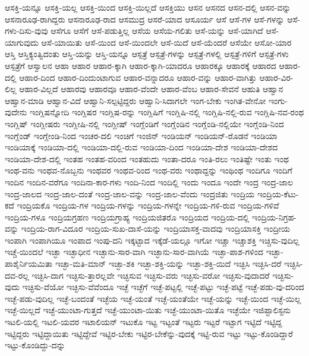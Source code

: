 {ಆಸಕ್ತಿ-ಯನ್ನೂ
ಆಸಕ್ತಿ-ಯಲ್ಲ
ಆಸಕ್ತಿ-ಯಿಂದ
ಆಸಕ್ತಿ-ಯಿಲ್ಲದೆ
ಆಸಕ್ತಿಯು
ಆಸನ
ಆಸನದ
ಆಸನ-ದಲ್ಲಿ
ಆಸನ-ವನ್ನು
ಆಸನಾರೂಢ-ರಾಗಿದ್ದರು
ಆಸನಾರೂಢ-ರಾದ
ಆಸಮುದ್ರ
ಆಸರೆ-ಯಾದ
ಆಸೂರ್ಯ
ಆಸೆ
ಆಸೆ-ಗಳ
ಆಸೆ-ಗಳನ್ನು
ಆಸೆ-ಗಳು-ದಿಸು-ವುವು
ಆಸೆಗೂ
ಆಸೆಗೆ
ಆಸೆ-ಪಡುತ್ತಿಲ್ಲ
ಆಸೆಯ
ಆಸೆಯ-ಗಲಿತು
ಆಸೆ-ಯನ್ನು
ಆಸೆ-ಯಾಗಿದೆ
ಆಸೆ-ಯಾಗುವುದು
ಆಸೆ-ಯಾಯಿತು
ಆಸೆ-ಯಿಂದ
ಆಸೆ-ಯಿಂದಲೇ
ಆಸೆ-ಯಿದೆ
ಆಸೆ-ಯೆಂದರೆ
ಆಸೆಯೇ
ಆಸೋ-ಯಾರ
ಆಸ್ತಿ
ಆಸ್ತಿಕ್ಯಂತ್ವಿದಂತು
ಆಸ್ತಿ-ಯನ್ನು
ಆಸ್ತಿ-ಯನ್ನೂ
ಆಸ್ಪತ್ರೆ
ಆಸ್ಪತ್ರೆ-ಗಳನ್ನು
ಆಸ್ಪತ್ರೆ-ಗಳಲ್ಲಿ
ಆಸ್ಪತ್ರೆ-ಗಳಿಗೆ
ಆಸ್ಪತ್ರೆ-ಗಳು
ಆಸ್ಪತ್ರೆಗೆ
ಆಸ್ವಾಲನ
ಆಹಾ
ಆಹಾರ
ಆಹಾರ-ಕ್ಕಾಗಿ
ಆಹಾರ-ಕ್ಕಾಗಿ-ಯಾದರೂ
ಆಹಾರಕ್ಕೂ
ಆಹಾರಕ್ಕೆ
ಆಹಾರದ
ಆಹಾರ-ದಲ್ಲಿ
ಆಹಾರ-ದಿಂದ
ಆಹಾರ-ದಿಂದುಂಟಾಗುವ
ಆಹಾರ-ವನ್ನಾದರೂ
ಆಹಾರ-ವನ್ನು
ಆಹಾರ-ವಾಗಿತ್ತು
ಆಹಾರ-ವಿರ-ಲಿಲ್ಲ
ಆಹಾರ-ವಿಲ್ಲದೆ
ಆಹಾರವು
ಆಹಾರವೂ
ಆಹಾರ-ವೆಂದೇ
ಆಹಾರ-ವೆಂಬ
ಆಹಾರ-ಸೇವನೆ
ಆಹುತಿ
ಆಹ್ವಾನ
ಆಹ್ವಾನ-ಮಾಡಿ
ಆಹ್ವಾನ-ವಿದೆ
ಆಹ್ವಾನಿ-ಸಲ್ಪಟ್ಟಿದ್ದರು
ಆಹ್ವಾನಿ-ಸಿದಾಗಲೇ
ಇಂಗ-ಬೇಕು
ಇಂಗಿತ-ವೇನೋ
ಇಂಗು-ವುದೇನು
ಇಂಗ್ಲಿಷನ್ನೋದಿ
ಇಂಗ್ಲಿಷರ
ಇಂಗ್ಲಿಷ-ರನ್ನು
ಇಂಗ್ಲಿಷಿಗೆ
ಇಂಗ್ಲಿಷಿ-ನಲ್ಲಿ
ಇಂಗ್ಲಿಷಿ-ನಲ್ಲಿ-ರುವ
ಇಂಗ್ಲಿಷಿ-ನವ-ರಂಥ
ಇಂಗ್ಲಿಷ್
ಇಂಗ್ಲೀಷರು
ಇಂಗ್ಲೀಷಿ-ನಲ್ಲಿ
ಇಂಗ್ಲೀಷ್
ಇಂಗ್ಲೆಂಡಿಗೆ
ಇಂಗ್ಲೆಂಡಿನ
ಇಂಗ್ಲೆಂಡಿ-ನಲ್ಲಿಯೇ
ಇಂಗ್ಲೆಂಡಿ-ನಿಂದ
ಇಂಗ್ಲೆಂಡ್
ಇಂಗ್ಲೇಂಡಿ-ನಿಂದ
ಇಂಚರ-ದಲಿ
ಇಂಚಿಗೆ
ಇಂಜಿನ್
ಇಂಡಿಯನ್
ಇಂಡಿಯನ್-ರೊಡನೆ
ಇಂಡಿಯಾ
ಇಂಡಿಯಾಕ್ಕೆ
ಇಂಡಿಯಾ-ದಲ್ಲಿ
ಇಂಡಿಯಾ-ದಲ್ಲಿ-ರುವ
ಇಂಡಿಯಾ-ದಿಂದ
ಇಂಡಿಯಾ-ದೇಶ
ಇಂಡಿಯಾ-ದೇಶದ
ಇಂಡಿಯಾ-ದೇಶ-ದಲ್ಲಿ
ಇಂತಹ
ಇಂತಹ-ವರಿಂದ
ಇಂತಹುದು
ಇಂತಾ-ದರೂ
ಇಂತಿ-ರಲು
ಇಂತಿಷ್ಟೇ
ಇಂತು
ಇಂಥ
ಇಂಥ-ವನು
ಇಂಥವ-ನೊಬ್ಬನು
ಇಂಥವರ
ಇಂಥವ-ರಿಂದ
ಇಂಥ-ವರು
ಇಂಥಾದ್ದನ್ನು
ಇಂಥಿಂಥ
ಇಂದಿಗೂ
ಇಂದಿಗೆ
ಇಂದಿನ
ಇಂದಿನ-ವರೆಗೂ
ಇಂದಿನಾ-ಕಾರ-ಗಳು
ಇಂದಿ-ನಿಂದ
ಇಂದಿಲ್ಲಿ
ಇಂದು
ಇಂದೂ
ಇಂದೇ
ಇಂದ್ರ
ಇಂದ್ರ-ಜಾಲ
ಇಂದ್ರ-ಜಾಲದ
ಇಂದ್ರ-ಜಾಲ-ದಂತೆ
ಇಂದ್ರ-ಜಾಲ-ವನ್ನು
ಇಂದ್ರ-ಜಾಲ-ವೆಂದು
ಇಂದ್ರಜಿತು
ಇಂದ್ರಿಯ
ಇಂದ್ರಿಯ-ಕೆಟು-ಕದೆ
ಇಂದ್ರಿಯಕೊ
ಇಂದ್ರಿಯ-ಗಳ
ಇಂದ್ರಿಯ-ಗಳನ್ನು
ಇಂದ್ರಿಯ-ಗಳನ್ನೇ
ಇಂದ್ರಿಯ-ಗಳಿ-ರುವ
ಇಂದ್ರಿಯ-ಗಳಿವೆ
ಇಂದ್ರಿಯ-ಗಳೂ
ಇಂದ್ರಿಯಗ್ರಹಣ
ಇಂದ್ರಿಯಗ್ರಾಹ್ಯ
ಇಂದ್ರಿಯಜಿತರೊ
ಇಂದ್ರಿಯದ
ಇಂದ್ರಿಯ-ದಲ್ಲಿ
ಇಂದ್ರಿಯ-ನಿಗ್ರಹ-ವನ್ನು
ಇಂದ್ರಿಯ-ರಾಗ-ವಿದೂರ
ಇಂದ್ರಿಯ-ಸುಖ-ದಾಸೆ-ಯನ್ನು
ಇಂದ್ರಿಯಾಸಕ್ತ-ವಾದವು
ಇಂದ್ರಿಯಾಸಕ್ತಿ
ಇಂದ್ರೀಯ
ಇಂಪಾಗಿ
ಇಂಪಾಗಿಯೂ
ಇಂಪಾದ
ಇಂಪು-ದನಿ
ಇಕ್ಕಟ್ಟಾದ
ಇಕ್ಕೆಡೆ-ಯಲ್ಲೂ
ಇಗೋ
ಇಚ್ಚಾ
ಇಚ್ಚಾಶಕ್ತಿ
ಇಚ್ಚಿಸು-ವುದಿಲ್ಲ
ಇಚ್ಚೆ-ಯಿಂದಲೆ
ಇಚ್ಛಾ
ಇಚ್ಛಾಧೀನ
ಇಚ್ಛಾನು-ಸಾರ-ವಾಗಿ
ಇಚ್ಛಾನು-ಸಾರ-ವಾಗಿಯೆ
ಇಚ್ಛಾ-ಪಾಶ-ಗಳಿಂದ
ಇಚ್ಛಾ-ಪಾಶೈರ್ನಿಯಮಿತಾ
ಇಚ್ಛಾ-ಮತಿ-ಮಾನ್
ಇಚ್ಛಾ-ಶಕಿ
ಇಚ್ಛಾ-ಶಕ್ತಿ-ಯನ್ನು
ಇಚ್ಛಾ-ಶಕ್ತಿ-ಯಿದೆ
ಇಚ್ಛಿಸಿ
ಇಚ್ಛಿಸಿ-ದರೆ
ಇಚ್ಛಿಸಿ-ದವ-ರಲ್ಲ
ಇಚ್ಛಿಸಿ-ದಾಗ
ಇಚ್ಛಿಸು-ತ್ತಾರಲ್ಲವೇ
ಇಚ್ಛಿಸುವ
ಇಚ್ಛಿಸು-ವರು
ಇಚ್ಛಿಸು-ವರೋ
ಇಚ್ಛಿಸು-ವುದಾದರೆ
ಇಚ್ಛಿಸು-ವುದು
ಇಚ್ಛಿಸು-ವೆಯೋ
ಇಚ್ಛಿಸು-ವೆವೆಂದೂ
ಇಚ್ಛೆ
ಇಚ್ಛೆಗೆ
ಇಚ್ಛೆ-ಪಟ್ಟಲ್ಲಿ
ಇಚ್ಛೆ-ಪಟ್ಟು
ಇಚ್ಛೆ-ಪಟ್ಟೆ
ಇಚ್ಛೆ-ಪಡು-ವು-ದರಿಂದ
ಇಚ್ಛೆ-ಪಡು-ವುದಿಲ್ಲ
ಇಚ್ಛೆ-ಬಂದಂತೆ
ಇಚ್ಛೆಯ
ಇಚ್ಛೆ-ಯಂತೆ
ಇಚ್ಛೆ-ಯಂತೆಯೇ
ಇಚ್ಛೆ-ಯನ್ನು
ಇಚ್ಛೆ-ಯಿಂದ
ಇಚ್ಛೆ-ಯಿಲ್ಲ
ಇಚ್ಛೆ-ಯಿಲ್ಲದೆ
ಇಚ್ಛೆ-ಯುಂಟಾ-ಗುತ್ತದೆ
ಇಚ್ಛೆ-ಯುಂಟಾ-ಯಿತು
ಇಚ್ಛೆ-ಯುಂಟಾ-ಯಿತೊ
ಇಚ್ಛೆಯೇ
ಇಜಿಪ್ಟಾಲಿಸ್ಟನು
ಇಟಲಿ-ಯಲ್ಲಿ
ಇಟಲಿ-ಯವರ
ಇಟಾಲಿಯನ್
ಇಟುಕೊ
ಇಟ್ಟ
ಇಟ್ಟಂತೆ
ಇಟ್ಟರು
ಇಟ್ಟರೆ
ಇಟ್ಟಾಗ
ಇಟ್ಟಿದೆ
ಇಟ್ಟಿದ್ದ
ಇಟ್ಟಿದ್ದರು
ಇಟ್ಟಿದ್ದಾಯಿತು
ಇಟ್ಟಿದ್ದೇವೆ
ಇಟ್ಟಿರ-ಬೇಕು
ಇಟ್ಟಿರ-ಬೇಕೆನ್ನು-ವುದಕ್ಕೆ
ಇಟ್ಟಿ-ರುವ
ಇಟ್ಟು
ಇಟ್ಟು-ಕೊಂಡಿದ್ದಾರೆ
ಇಟ್ಟು-ಕೊಂಡಿದ್ದು-ದನ್ನು
}
